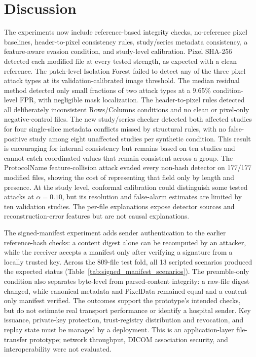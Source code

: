 \documentclass[journal]{IEEEtran}
\begin{document}
  \section{Discussion}
  The experiments now include reference-based integrity checks, no-reference pixel baselines, header-to-pixel consistency rules, study/series metadata consistency, a feature-aware evasion condition, and study-level calibration. Pixel SHA-256 detected each modified file at every tested strength, as expected with a clean reference. The patch-level Isolation Forest failed to detect any of the three pixel attack types at its validation-calibrated image threshold. The median residual method detected only small fractions of two attack types at a 9.65\% condition-level FPR, with negligible mask localization. The header-to-pixel rules detected all deliberately inconsistent Rows/Columns conditions and no clean or pixel-only negative-control files. The new study/series checker detected both affected studies for four single-slice metadata conflicts missed by structural rules, with no false-positive study among eight unaffected studies per synthetic condition. This result is encouraging for internal consistency but remains based on ten studies and cannot catch coordinated values that remain consistent across a group. The ProtocolName feature-collision attack evaded every non-hash detector on 177/177 modified files, showing the cost of representing that field only by length and presence. At the study level, conformal calibration could distinguish some tested attacks at $\alpha=0.10$, but its resolution and false-alarm estimates are limited by ten validation studies. The per-file explanations expose detector sources and reconstruction-error features but are not causal explanations.

  The signed-manifest experiment adds sender authentication to the earlier reference-hash checks: a content digest alone can be recomputed by an attacker, while the receiver accepts a manifest only after verifying a signature from a locally trusted key. Across the 809-file test fold, all 13 scripted scenarios produced the expected status (Table~\ref{tab:signed_manifest_scenarios}). The preamble-only condition also separates byte-level from parsed-content integrity: a raw-file digest changed, while canonical metadata and PixelData remained equal and a content-only manifest verified. The outcomes support the prototype's intended checks, but do not estimate real transport performance or identify a hospital sender. Key issuance, private-key protection, trust-registry distribution and revocation, and replay state must be managed by a deployment. This is an application-layer file-transfer prototype; network throughput, DICOM association security, and interoperability were not evaluated.
\end{document}
